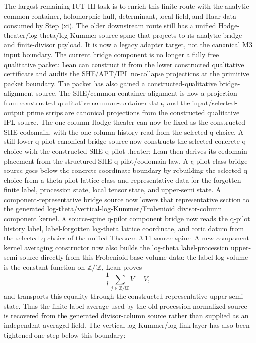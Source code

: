 \documentclass[11pt]{article}
\theoremstyle{plain}
\theoremstyle{definition}
\theoremstyle{remark}
\begin{document}
The largest remaining IUT III task is to enrich this finite route with the
analytic common-container, holomorphic-hull, determinant, local-field, and
Haar data consumed by Step (xi).  The older downstream route still has a
unified Hodge-theater/log-theta/log-Kummer source spine that projects to its
analytic bridge and finite-divisor payload.  It is now a legacy adapter target,
not the canonical M3 input boundary.  The
current bridge component is no longer a fully free qualitative packet: Lean can
construct it from the lower constructed qualitative certificate and audits the
SHE/APT/IPL no-collapse projections at the primitive packet boundary.  The
packet has also gained a constructed-qualitative bridge-alignment source.  The
SHE/common-container alignment is now a projection from constructed qualitative
common-container data, and the input/selected-output prime strips are canonical
projections from the constructed qualitative IPL source.  The one-column Hodge
theater can now be fixed as the constructed SHE codomain, with the one-column
history read from the selected q-choice.  A still lower q-pilot-canonical
bridge source now constructs the selected concrete q-choice with the constructed
SHE q-pilot theater; Lean then derives its codomain placement from the
structured SHE q-pilot/codomain law.  A q-pilot-class bridge source goes below
the concrete-coordinate boundary by rebuilding the selected q-choice from a
theta-pilot lattice class and representative data for the forgotten finite
label, procession state, local tensor state, and upper-semi state.  A
component-representative bridge source now lowers that representative section
to the generated log-theta/vertical-log-Kummer/Frobenioid divisor-column
component kernel.  A source-spine q-pilot component bridge now reads the
q-pilot history label, label-forgotten log-theta lattice coordinate, and coric
datum from the selected q-choice of the unified Theorem 3.11 source spine.  A
new component-kernel averaging constructor now also builds the
log-theta label-procession upper-semi source directly from this Frobenioid
base-volume data: the label log-volume is the constant function on
\(\mathbb Z/l\mathbb Z\), Lean proves
\[
  \frac{1}{l}\sum_{j\in \mathbb Z/l\mathbb Z}V=V,
\]
and transports this equality through the constructed representative
upper-semi state.  Thus the finite label average used by the old
procession-normalized source is recovered from the generated divisor-column
source rather than supplied as an independent averaged field.  The vertical
log-Kummer/log-link layer has also been tightened one step below this boundary:
\end{document}
